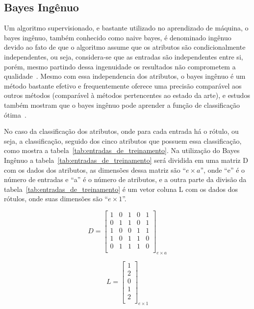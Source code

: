 \subsection{Bayes Ingênuo}

Um algoritmo supervisionado, e bastante utilizado no aprendizado de máquina,
o bayes ingênuo, também conhecido como naive bayes, é denominado ingênuo devido
ao fato de que o algoritmo assume que os atributos são condicionalmente
independentes, ou seja, considera-se que as entradas são independentes entre
si, porém, mesmo partindo dessa ingenuidade os resultados não comprometem a
qualidade~\cite{bruno2010aprendizadomaquina}. Mesmo com essa independencia dos
atributos, o bayes ingênuo é um método bastante efetivo e frequentemente oferece
uma precisão comparável aos outros métodos (comparável à métodos pertencentes ao
estado da arte), e estudos também mostram que o bayes ingênuo pode aprender a
função de classificação ótima~\cite{santos2010naivebayes}.

No caso da classificação dos atributos, onde para cada entrada há o rótulo, ou
seja, a classificação, seguido dos cinco atributos que possuem essa classificação,
como mostra a tabela~\ref{tab:entradas_de_treinamento}. Na utilização do Bayes
Ingênuo a tabela~\ref{tab:entradas_de_treinamento} será dividida em uma matriz D
com os dados dos atributos, as dimensões dessa matriz são ``${e \times a}$'', onde
``e'' é o número de entradas e ``a'' é o número de atributos, e a outra parte da
divisão da tabela~\ref{tab:entradas_de_treinamento} é um vetor coluna L com os
dados dos rótulos, onde suas dimensões são ``${e \times 1}$''.

$$D=\left[
\begin{array}{ccccc}
1 & 0 & 1 & 0 & 1 \\
0 & 1 & 1 & 0 & 1 \\
1 & 0 & 0 & 1 & 1 \\
1 & 0 & 1 & 1 & 0 \\
0 & 1 & 1 & 1 & 0 \\
\end{array}
\right]_{e \times a}$$

$$L=\left[
\begin{array}{c}
1 \\
2 \\
0 \\
1 \\
2 \\
\end{array}
\right]_{e \times 1}$$

